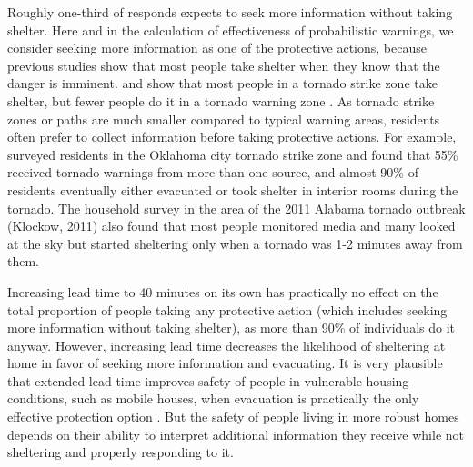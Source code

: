 \documentclass{ametsocV6.1}
\begin{document}
Roughly one-third of responds expects to seek more information without taking shelter. Here and in the calculation of effectiveness of probabilistic warnings, we consider seeking more information as one of the protective actions, because previous studies show that most people take shelter when they know that the danger is imminent. \citet{hammer_response_2002} and \citet{klockow_investigation_2011} show that most people in a tornado strike zone take shelter, but fewer people do it in a tornado warning zone \citep*{liu_assessment_1996, sherman-morris_tornado_2010}. As tornado strike zones or paths are much smaller compared to typical warning areas, residents often prefer to collect information before taking protective actions. For example, \citet{hammer_response_2002} surveyed residents in the Oklahoma city tornado strike zone and found that 55\% received tornado warnings from more than one source, and almost 90\% of residents eventually either evacuated or took shelter in interior rooms during the tornado. The household survey in the area of the 2011 Alabama tornado outbreak (Klockow, 2011) also found that most people monitored media and many looked at the sky but started sheltering only when a tornado was 1-2 minutes away from them.

Increasing lead time to 40 minutes on its own has practically no effect on the total proportion of people taking any protective action (which includes seeking more information without taking shelter), as more than 90\% of individuals do it anyway. However, increasing lead time decreases the likelihood of sheltering at home in favor of seeking more information and evacuating. It is very plausible that extended lead time improves safety of people in vulnerable housing conditions, such as mobile houses, when evacuation is practically the only effective protection option \citep{schmidlin_tornado_2009}. But the safety of people living in more robust homes depends on their ability to interpret additional information they receive while not sheltering and properly responding to it.
\end{document}
